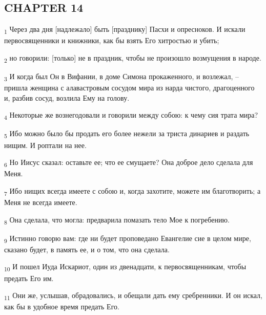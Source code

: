 \subsection{CHAPTER 14}
\begin{tcolorbox}
\textsubscript{1} Через два дня [надлежало] быть [празднику] Пасхи и опресноков. И искали первосвященники и книжники, как бы взять Его хитростью и убить;
\end{tcolorbox}
\begin{tcolorbox}
\textsubscript{2} но говорили: [только] не в праздник, чтобы не произошло возмущения в народе.
\end{tcolorbox}
\begin{tcolorbox}
\textsubscript{3} И когда был Он в Вифании, в доме Симона прокаженного, и возлежал, --пришла женщина с алавастровым сосудом мира из нарда чистого, драгоценного и, разбив сосуд, возлила Ему на голову.
\end{tcolorbox}
\begin{tcolorbox}
\textsubscript{4} Некоторые же вознегодовали и говорили между собою: к чему сия трата мира?
\end{tcolorbox}
\begin{tcolorbox}
\textsubscript{5} Ибо можно было бы продать его более нежели за триста динариев и раздать нищим. И роптали на нее.
\end{tcolorbox}
\begin{tcolorbox}
\textsubscript{6} Но Иисус сказал: оставьте ее; что ее смущаете? Она доброе дело сделала для Меня.
\end{tcolorbox}
\begin{tcolorbox}
\textsubscript{7} Ибо нищих всегда имеете с собою и, когда захотите, можете им благотворить; а Меня не всегда имеете.
\end{tcolorbox}
\begin{tcolorbox}
\textsubscript{8} Она сделала, что могла: предварила помазать тело Мое к погребению.
\end{tcolorbox}
\begin{tcolorbox}
\textsubscript{9} Истинно говорю вам: где ни будет проповедано Евангелие сие в целом мире, сказано будет, в память ее, и о том, что она сделала.
\end{tcolorbox}
\begin{tcolorbox}
\textsubscript{10} И пошел Иуда Искариот, один из двенадцати, к первосвященникам, чтобы предать Его им.
\end{tcolorbox}
\begin{tcolorbox}
\textsubscript{11} Они же, услышав, обрадовались, и обещали дать ему сребренники. И он искал, как бы в удобное время предать Его.
\end{tcolorbox}
